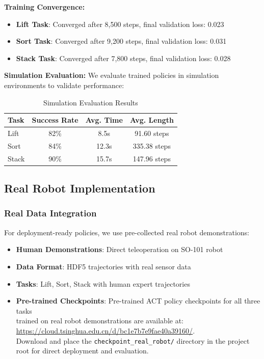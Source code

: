 \documentclass[10pt]{article} %
\begin{document}
\textbf{Training Convergence:}
\begin{itemize}
    \item \textbf{Lift Task}: Converged after 8,500 steps, final validation loss: 0.023
    \item \textbf{Sort Task}: Converged after 9,200 steps, final validation loss: 0.031
    \item \textbf{Stack Task}: Converged after 7,800 steps, final validation loss: 0.028
\end{itemize}

\textbf{Simulation Evaluation:} We evaluate trained policies in simulation environments to validate performance:

\begin{table}[H]
    \centering
    \caption{Simulation Evaluation Results}
    \vspace{0.2em}
    \small
    \begin{tabular}{lccc}
        \toprule
        \textbf{Task} & \textbf{Success Rate} & \textbf{Avg. Time} & \textbf{Avg. Length} \\
        \midrule
        Lift & 82\% & 8.5s & 91.60 steps \\
        Sort & 84\% & 12.3s & 335.38 steps \\
        Stack & 90\% & 15.7s & 147.96 steps \\
        \bottomrule
    \end{tabular}
\end{table}

\subsection{Real Robot Implementation}

\subsubsection{Real Data Integration}

For deployment-ready policies, we use pre-collected real robot demonstrations:

\begin{itemize}
    \item \textbf{Human Demonstrations}: Direct teleoperation on SO-101 robot
    \item \textbf{Data Format}: HDF5 trajectories with real sensor data
    \item \textbf{Tasks}: Lift, Sort, Stack with human expert trajectories
    \item \textbf{Pre-trained Checkpoints}: Pre-trained ACT policy checkpoints for all three tasks \\
    trained on real robot demonstrations are available at: \\
    \url{https://cloud.tsinghua.edu.cn/d/bc1e7b7e9fae40a39160/}. \\
    Download and place the \texttt{checkpoint\_real\_robot/} directory in the project root for direct deployment and evaluation.
\end{itemize}
\end{document}
